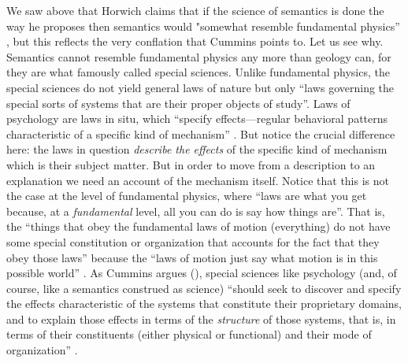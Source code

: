 We saw above that Horwich claims that if the science of semantics is done the way he proposes then semantics would "somewhat resemble fundamental physics” \citep[318]{Horwich2008}, but this reflects the very conflation that Cummins points to. Let us see why. Semantics cannot resemble fundamental physics any more than geology can, for they are what \citet{Fodor1974} famously called special sciences. Unlike fundamental physics, the special sciences do not yield general laws of nature but only “laws governing the special sorts of systems that are their proper objects of study”. Laws of psychology are laws in situ, which “specify effects—regular behavioral patterns characteristic of a specific kind of mechanism” \citep[121]{Cummins2000}. But notice the crucial difference here: the laws in question \textit{describe the effects} of the specific kind of mechanism which is their subject matter. But in order to move from a description to an explanation we need an account of the mechanism itself. Notice that this is not the case at the level of fundamental physics, where “laws are what you get because, at a \textit{fundamental} level, all you can do is say how things are”. That is, the “things that obey the fundamental laws of motion (everything) do not have some special constitution or organization that accounts for the fact that they obey those laws” because the “laws of motion just say what motion is in this possible world” \citep[122, emphasis in original]{Cummins2000}. As Cummins argues (\citealt{Cummins1975,Cummins1983,Cummins2010,RothCummins2014}), special sciences like psychology (and, of course, like a semantics construed as science) “should seek to discover and specify the effects characteristic of the systems that constitute their proprietary domains, and to explain those effects in terms of the \textit{structure} of those systems, that is, in terms of their constituents (either physical or functional) and their mode of organization” \citep[122, emphasis in original]{Cummins2000}.

